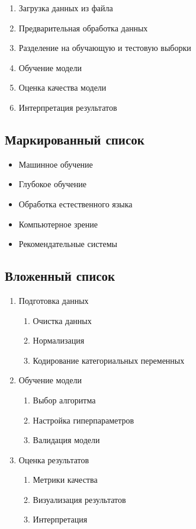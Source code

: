 \begin{enumerate}
\item Загрузка данных из файла
\item Предварительная обработка данных
\item Разделение на обучающую и тестовую выборки
\item Обучение модели
\item Оценка качества модели
\item Интерпретация результатов
\end{enumerate}

\subsection{Маркированный список}

\begin{itemize}
\item Машинное обучение
\item Глубокое обучение
\item Обработка естественного языка
\item Компьютерное зрение
\item Рекомендательные системы
\end{itemize}

\subsection{Вложенный список}

\begin{enumerate}
\item Подготовка данных
    \begin{enumerate}
    \item Очистка данных
    \item Нормализация
    \item Кодирование категориальных переменных
    \end{enumerate}
\item Обучение модели
    \begin{enumerate}
    \item Выбор алгоритма
    \item Настройка гиперпараметров
    \item Валидация модели
    \end{enumerate}
\item Оценка результатов
    \begin{enumerate}
    \item Метрики качества
    \item Визуализация результатов
    \item Интерпретация
    \end{enumerate}
\end{enumerate}
